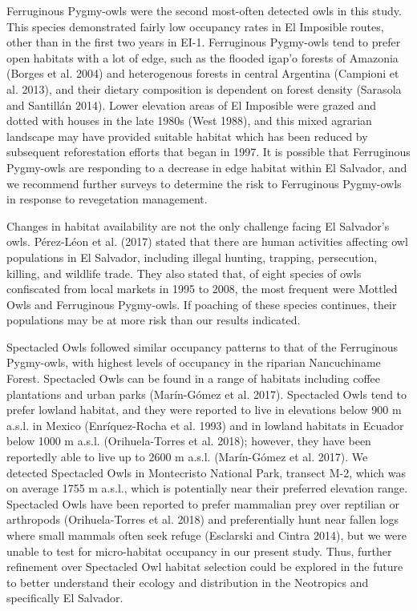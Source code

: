 \documentclass[
]{article}
\begin{document}
Ferruginous Pygmy-owls were the second most-often detected owls in this
study. This species demonstrated fairly low occupancy rates in El
Imposible routes, other than in the first two years in EI-1. Ferruginous
Pygmy-owls tend to prefer open habitats with a lot of edge, such as the
flooded igap'o forests of Amazonia (Borges et al. 2004) and heterogenous
forests in central Argentina (Campioni et al. 2013), and their dietary
composition is dependent on forest density (Sarasola and Santillán
2014). Lower elevation areas of El Imposible were grazed and dotted with
houses in the late 1980s (West 1988), and this mixed agrarian landscape
may have provided suitable habitat which has been reduced by subsequent
reforestation efforts that began in 1997. It is possible that
Ferruginous Pygmy-owls are responding to a decrease in edge habitat
within El Salvador, and we recommend further surveys to determine the
risk to Ferruginous Pygmy-owls in response to revegetation management.

Changes in habitat availability are not the only challenge facing El
Salvador's owls. Pérez-Léon et al. (2017) stated that there are human
activities affecting owl populations in El Salvador, including illegal
hunting, trapping, persecution, killing, and wildlife trade. They also
stated that, of eight species of owls confiscated from local markets in
1995 to 2008, the most frequent were Mottled Owls and Ferruginous
Pygmy-owls. If poaching of these species continues, their populations
may be at more risk than our results indicated.

Spectacled Owls followed similar occupancy patterns to that of the
Ferruginous Pygmy-owls, with highest levels of occupancy in the riparian
Nancuchiname Forest. Spectacled Owls can be found in a range of habitats
including coffee plantations and urban parks (Marín-Gómez et al. 2017).
Spectacled Owls tend to prefer lowland habitat, and they were reported
to live in elevations below 900 m a.s.l. in Mexico (Enríquez-Rocha et
al. 1993) and in lowland habitats in Ecuador below 1000 m a.s.l.
(Orihuela-Torres et al. 2018); however, they have been reportedly able
to live up to 2600 m a.s.l. (Marín-Gómez et al. 2017). We detected
Spectacled Owls in Montecristo National Park, transect M-2, which was on
average 1755 m a.s.l., which is potentially near their preferred
elevation range. Spectacled Owls have been reported to prefer mammalian
prey over reptilian or arthropods (Orihuela-Torres et al. 2018) and
preferentially hunt near fallen logs where small mammals often seek
refuge (Esclarski and Cintra 2014), but we were unable to test for
micro-habitat occupancy in our present study. Thus, further refinement
over Spectacled Owl habitat selection could be explored in the future to
better understand their ecology and distribution in the Neotropics and
specifically El Salvador.
\end{document}
